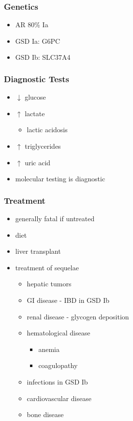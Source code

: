 \documentclass{scrartcl}
\begin{document}
\subsubsection{Genetics}
\label{sec:org7dabfad}
\begin{itemize}
\item AR 80\% Ia
\item GSD Ia: G6PC
\item GSD Ib: SLC37A4
\end{itemize}

\subsubsection{Diagnostic Tests}
\label{sec:orgaed4e90}
\begin{itemize}
\item \(\downarrow\) glucose
\item \(\uparrow\) lactate
\begin{itemize}
\item lactic acidosis
\end{itemize}
\item \(\uparrow\) triglycerides
\item \(\uparrow\) uric acid
\item molecular testing is diagnostic
\end{itemize}

\subsubsection{Treatment}
\label{sec:org1209f75}
\begin{itemize}
\item generally fatal if untreated
\item diet
\item liver transplant
\item treatment of sequelae
\begin{itemize}
\item hepatic tumors
\item GI disease - IBD in GSD Ib
\item renal disease - glycogen deposition
\item hematological disease
\begin{itemize}
\item anemia
\item coagulopathy
\end{itemize}
\item infections in GSD Ib
\item cardiovascular disease
\item bone disease
\end{itemize}
\end{itemize}
\end{document}
